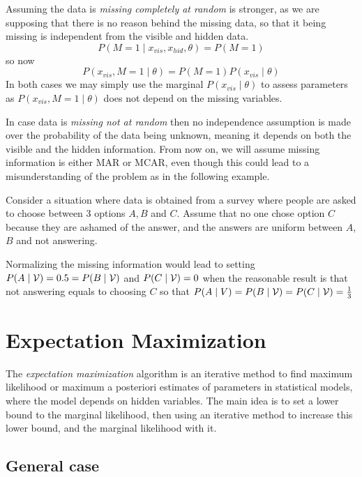 Assuming the data is \emph{missing completely at random} is stronger, as we are supposing that there is no reason behind the missing data, so that it being missing is independent from the visible and hidden data.
\[
  P(M = 1 \mid x_{vis}, x_{hid}, \theta) = P(M = 1)
\]
so now
\[
    P( x_{vis}, M = 1 \mid \theta) = P(M = 1)P( x_{vis} \mid \theta)
\]
In both cases we may simply use the marginal \(P(x_{vis} \mid \theta)\) to assess parameters as \(P( x_{vis}, M = 1 \mid \theta)\) does not depend on the missing variables.

In case data is \emph{missing not at random} then no independence assumption is made over the probability of the data being unknown, meaning it depends on both the visible and the hidden information. From now on, we will assume missing information is either MAR or MCAR, even though this could lead to a misunderstanding of the problem as in the following example.

\begin{exampleth}
  Consider a situation where data is obtained from a survey where people are asked to choose between 3 options \(A, B\) and \(C\). Assume that no one chose option \(C\) because they are ashamed of the answer, and the answers are uniform between \(A\), \(B\) and not answering.

  Normalizing the missing information would lead to setting \(P(A \mid \mathcal{V}) = 0.5 = P(B \mid \mathcal{V})\) and \(P(C \mid \mathcal{V}) = 0\) when the reasonable result is that not answering equals to choosing \(C\) so that \(P(A \mid V) = P(B \mid \mathcal{V}) = P(C \mid \mathcal{V}) = \frac{1}{3}\)
\end{exampleth}

\section{Expectation Maximization}

The \emph{expectation maximization} algorithm is an iterative method to find maximum likelihood or maximum a posteriori estimates of parameters in statistical models, where the model depends on hidden variables. The main idea is to set a lower bound to the marginal likelihood, then using an iterative method to increase this lower bound, and the marginal likelihood with it.

\subsection{General case}

